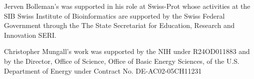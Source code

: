 \documentclass[10pt]{bmc_article}
\newenvironment{bmcformat}{\begin{raggedright}\baselineskip20pt\sloppy\setboolean{publ}{false}}{\end{raggedright}\baselineskip20pt\sloppy}
\begin{document}
\begin{bmcformat}
Jerven Bolleman's was supported in his role at Swiss-Prot whose activities at the SIB Swiss Institute of Bioinformatics are supported by the Swiss Federal Government through the The State Secretariat for Education, Research and Innovation SERI.

Christopher Mungall's work was supported by the NIH under R24OD011883 and by the Director, Office of Science, Office of Basic Energy Sciences, of the U.S. Department of Energy under Contract No. DE-AC02-05CH11231

\newpage
{
   }     %
  
\end{bmcformat}
\end{document}
